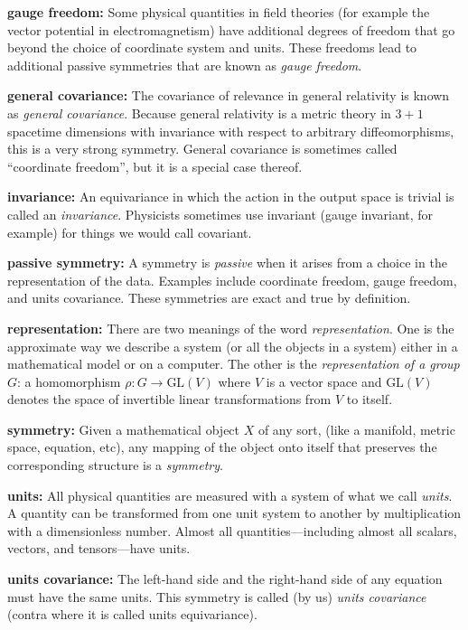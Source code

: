 \documentclass{article}
\theoremstyle{plain}
\theoremstyle{definition}
\theoremstyle{remark}
\begin{document}
\textbf{gauge freedom:}
Some physical quantities in field theories (for example the vector potential in electromagnetism) have additional degrees of freedom that go beyond the choice of coordinate system and units.
These freedoms lead to additional passive symmetries that are known as \emph{gauge freedom}.

\textbf{general covariance:}
The covariance of relevance in general relativity \cite{einstein} is known as \emph{general covariance}.
Because general relativity is a metric theory in $3+1$ spacetime dimensions with invariance with respect to arbitrary diffeomorphisms, this is a very strong symmetry.
General covariance is sometimes called ``coordinate freedom'', but it is a special case thereof.

\textbf{invariance:}
An equivariance in which the action in the output space is trivial is called an \emph{invariance}. Physicists sometimes use invariant (gauge invariant, for example) for things we would call covariant.

\textbf{passive symmetry:}
A symmetry is \emph{passive} when it arises from a choice in the representation of the data. 
Examples include coordinate freedom, gauge freedom, and units covariance.
These symmetries are exact and true by definition.

\textbf{representation:}
There are two meanings of the word \emph{representation}. One is the approximate way we describe a system (or all the objects in a system) either in a mathematical model or on a computer.
The other is the \emph{representation of a group} $G$: a homomorphism $\rho: G\to \text{GL}(V)$ where $V$ is a vector space and $\text{GL}(V)$ denotes the space of invertible linear transformations from $V$ to itself.

\textbf{symmetry:}
Given a mathematical object $X$ of any sort, (like a manifold, metric space, equation, etc), any mapping of the object onto itself that preserves the corresponding structure is a \emph{symmetry}.

\textbf{units:}
All physical quantities are measured with a system of what we call \emph{units}.
A quantity can be transformed from one unit system to another by multiplication with a dimensionless number.
Almost all quantities---including almost all scalars, vectors, and tensors---have units.

\textbf{units covariance:}
The left-hand side and the right-hand side of any equation must have the same units.
This symmetry is called (by us) \emph{units covariance} (contra \cite{villar2022dimensionless} where it is called units equivariance).
 
\end{document}
